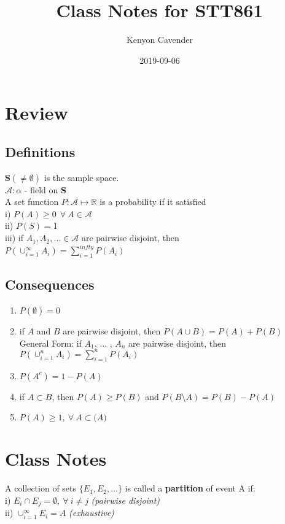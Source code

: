 \documentclass[14pt, oneside, letterpaper]{notes}
\begin{document}
\title{Class Notes for STT861}
\author{Kenyon Cavender}
\date{2019-09-06}
\maketitle

\section{Review}
\subsection*{Definitions}
$\textbf{S} ( \neq \emptyset )$ is the sample space. \\
$\mathscr{A} :  \alpha  $ - field on \textbf{S} \\
A set function $P: \mathscr{A} \mapsto \mathbb{R}$ is a probability if it satisfied \\
\indent i) $P(A) \geq 0 \: \: \forall \: A \in \mathscr{A}$ \\
\indent ii) $P(S) = 1 $\\
\indent iii) if $A_1 , A_2 , ... \in \mathscr{A}$ are pairwise disjoint, then \\
\indent \indent $ P(\cup_{i = 1}^{\infty} A_i ) = \sum_{i=1}^{infty} P( A_i )$

\subsection*{Consequences}
\begin{enumerate}
	\item $P(\emptyset) = 0$ 
	
	\item if $A$ and $B$ are pairwise disjoint, then $P(A \cup B) = P(A) + P(B)$ \\
	General Form: if $A_1$, ... , $A_n$ are pairwise disjoint, then \\
	$P(\cup_{i=1}^n A_i) = \sum_{i=1}^n P(A_i)$ 

	\item $P(A^c) = 1-P(A)$

	\item if $A \subset B$, then $P(A) \geq P(B)$ and $P(B \setminus A) = P(B) - P(A)$ 

	\item $P(A) \geq 1,  \: \forall \: A \subset \mathscr(A)$ 
\end{enumerate}

\section{Class Notes}
\begin{mydef}
	A collection of sets $\{E_1, E_2, ...\}$ is called a \textbf{partition} 
		of event A if: \\
	\indent i) $E_i \cap E_j = \emptyset, \: \forall \: i \neq j$ 
		\textit{(pairwise disjoint)} \\
  	\indent ii) $\cup_{i=1}^{\infty}E_i = A$ 
		\textit{(exhaustive)}
\end{mydef}
\end{document}
